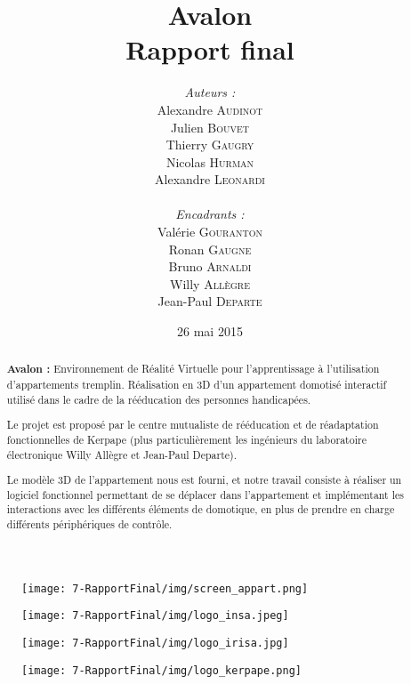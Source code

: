 \documentclass[a4paper,11pt]{article}
\title{
  \textbf{Avalon}\\
  Rapport final
}
\author{
\begin{minipage}{0.4\textwidth}
	\begin{flushleft} \large
		\emph{Auteurs :}\\
		Alexandre \textsc{Audinot}\\
		Julien \textsc{Bouvet}\\
		Thierry \textsc{Gaugry}\\
		Nicolas \textsc{Hurman}\\
		Alexandre \textsc{Leonardi}\\
	\end{flushleft}
\end{minipage}
\begin{minipage}{0.4\textwidth}
	\begin{flushright} \large
		\emph{Encadrants :} \\
		Valérie \textsc{Gouranton}\\
		Ronan \textsc{Gaugne}\\
		Bruno \textsc{Arnaldi}\\
		Willy \textsc{Allègre}\\
		Jean-Paul  \textsc{Departe}\\
	\end{flushright}
\end{minipage}
}
\date{26 mai 2015}
\begin{document}
\maketitle
\thispagestyle{empty}
\begin{abstract}
\textbf{Avalon :} Environnement de Réalité Virtuelle pour l'apprentissage à l'utilisation d'appartements tremplin. Réalisation en 3D d'un appartement domotisé interactif utilisé dans le cadre de la rééducation des personnes handicapées.\newline

Le projet est proposé par le centre mutualiste de rééducation et de réadaptation fonctionnelles de Kerpape (plus particulièrement les ingénieurs du laboratoire électronique Willy Allègre et Jean-Paul Departe).\newline

Le modèle 3D de l'appartement nous est fourni, et notre travail consiste à réaliser un logiciel fonctionnel permettant de se déplacer dans l'appartement et implémentant les interactions avec les différents éléments de domotique, en plus de prendre en charge différents périphériques de contrôle. 
\end{abstract}

\begin{figure}[h!]
	\centering
	\texttt{[image: 7-RapportFinal/img/screen\_appart.png]}
\end{figure}

\begin{figure}[h!]
   \begin{minipage}{0.3\linewidth}
      \texttt{[image: 7-RapportFinal/img/logo\_insa.jpeg]}
   \end{minipage} 
   \begin{minipage}{0.2\linewidth}
      \centering
      \texttt{[image: 7-RapportFinal/img/logo\_irisa.jpg]}
   \end{minipage}\hfill
   \begin{minipage}{0.2\linewidth}
      \texttt{[image: 7-RapportFinal/img/logo\_kerpape.png]}
   \end{minipage}
\end{figure}

\pagebreak

\tableofcontents
\pagebreak

\pagebreak

\pagebreak

\pagebreak

\pagebreak

\pagebreak

\pagebreak

\end{document}
